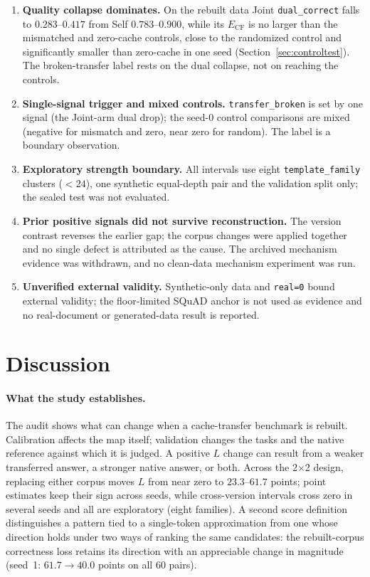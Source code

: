 \documentclass[11pt,twocolumn]{article}
\begin{document}
\begin{enumerate}
\item \textbf{Quality collapse dominates.} On the rebuilt data Joint
      \texttt{dual\_correct} falls to $0.283$--$0.417$ from Self $0.783$--$0.900$,
      while its $E_{\mathrm{CF}}$ is no larger than the mismatched and zero-cache
      controls, close to the randomized control and significantly smaller than
      zero-cache in one seed (Section~\ref{sec:controltest}).
      The broken-transfer label rests on the dual collapse, not on reaching the
      controls.
\item \textbf{Single-signal trigger and mixed controls.} \texttt{transfer\_broken}
      is set by one signal (the Joint-arm dual drop); the seed-0 control
      comparisons are mixed (negative for mismatch and zero, near zero for
      random). The label is a boundary observation.
\item \textbf{Exploratory strength boundary.} All intervals use eight
      \texttt{template\_family} clusters ($<24$), one synthetic equal-depth pair
      and the validation split only; the sealed test was not evaluated.
\item \textbf{Prior positive signals did not survive reconstruction.} The
      version contrast reverses the earlier gap; the corpus changes were applied
      together and no single defect is attributed as the cause. The archived
      mechanism evidence was withdrawn, and no clean-data mechanism experiment
      was run.
\item \textbf{Unverified external validity.} Synthetic-only data and
      \texttt{real=0} bound external validity; the floor-limited SQuAD anchor is
      not used as evidence and no real-document or generated-data result is
      reported.
\end{enumerate}

\section{Discussion}
\label{sec:discussion}

\paragraph{What the study establishes.} The audit shows what can change when a
cache-transfer benchmark is rebuilt. Calibration affects the map itself;
validation changes the tasks and the native reference against which it is
judged. A positive $L$ change can result from a weaker transferred answer, a
stronger native answer, or both. Across the 2$\times$2 design, replacing either
corpus moves $L$ from near zero to $23.3$--$61.7$ points; point estimates keep
their sign across seeds, while cross-version intervals cross zero in several
seeds and all are exploratory (eight families). A second score definition
distinguishes a pattern tied to a single-token approximation from one whose
direction holds under two ways of ranking the same candidates: the
rebuilt-corpus correctness loss retains its direction with an appreciable
change in magnitude (seed~1: $61.7\to40.0$ points on all 60 pairs).
\end{document}
